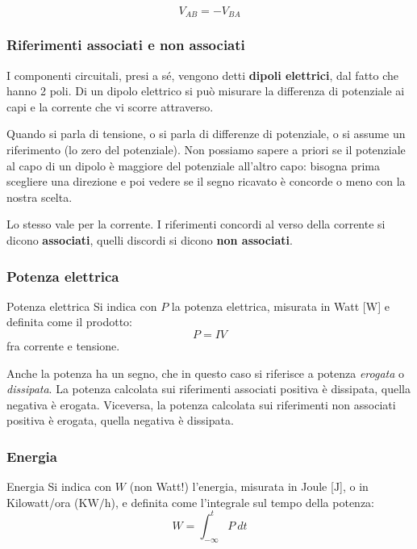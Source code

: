 \documentclass[a4paper,11pt]{article}
\begin{document}
$$
V_{AB} = -V_{BA}
$$

\subsubsection{Riferimenti associati e non associati}
I componenti circuitali, presi a sé, vengono detti \textbf{dipoli elettrici}, dal fatto che hanno 2 poli.
Di un dipolo elettrico si può misurare la differenza di potenziale ai capi e la corrente che vi scorre attraverso.

Quando si parla di tensione, o si parla di differenze di potenziale, o si assume un riferimento (lo zero del potenziale).
Non possiamo sapere a priori se il potenziale al capo di un dipolo è maggiore del potenziale all'altro capo: bisogna prima scegliere una direzione e poi vedere se il segno ricavato è concorde o meno con la nostra scelta.

Lo stesso vale per la corrente.
I riferimenti concordi al verso della corrente si dicono \textbf{associati}, quelli discordi si dicono \textbf{non associati}.

\subsubsection{Potenza elettrica}

\begin{definition}{Potenza elettrica}
Si indica con $P$ la potenza elettrica, misurata in Watt [$\mathrm{W}$] e definita come il prodotto:
$$
	P = IV
$$
fra corrente e tensione.
\end{definition}

Anche la potenza ha un segno, che in questo caso si riferisce a potenza \textit{erogata} o \textit{dissipata}.
La potenza calcolata sui riferimenti associati positiva è dissipata, quella negativa è erogata.
Viceversa, la potenza calcolata sui riferimenti non associati positiva è erogata, quella negativa è dissipata.

\subsubsection{Energia}

\begin{definition}{Energia}
Si indica con $W$ (non Watt!) l'energia, misurata in Joule [$\mathrm{J}$], o in Kilowatt/ora ($\mathrm{KW/h}$), e definita come l'integrale sul tempo della potenza:
$$
W = \int_{-\infty}^t P \ dt 
$$
\end{definition}
\end{document}
